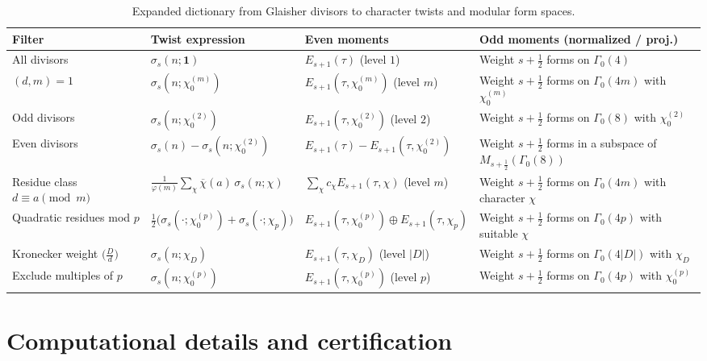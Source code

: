 \documentclass[11pt]{article}
\theoremstyle{definition}
\theoremstyle{remark}
\begin{document}
\begin{table}[h]
\centering
\renewcommand{\arraystretch}{1.2}
\small
\begin{tabularx}{\textwidth}{|l|X|X|X|}
\hline
\textbf{Filter} & \textbf{Twist expression} &
\textbf{Even moments} & \textbf{Odd moments (normalized / proj.)} \\
\hline
All divisors &
$\sigma_s(n;\mathbf 1)$ &
$E_{s+1}(\tau)$ (level $1$) &
Weight $s+\tfrac12$ forms on $\Gamma_0(4)$ \\
\hline
$(d,m)=1$ &
$\sigma_s(n;\chi_0^{(m)})$ &
$E_{s+1}(\tau,\chi_0^{(m)})$ (level $m$) &
Weight $s+\tfrac12$ forms on $\Gamma_0(4m)$ with $\chi_0^{(m)}$ \\
\hline
Odd divisors &
$\sigma_s(n;\chi_0^{(2)})$ &
$E_{s+1}(\tau,\chi_0^{(2)})$ (level $2$) &
Weight $s+\tfrac12$ forms on $\Gamma_0(8)$ with $\chi_0^{(2)}$ \\
\hline
Even divisors &
$\sigma_s(n)-\sigma_s(n;\chi_0^{(2)})$ &
$E_{s+1}(\tau)-E_{s+1}(\tau,\chi_0^{(2)})$ &
Weight $s+\tfrac12$ forms in a subspace of $M_{s+\tfrac12}(\Gamma_0(8))$ \\
\hline
Residue class $d\equiv a\pmod m$ &
$\tfrac1{\varphi(m)}\sum_\chi \overline{\chi}(a)\,\sigma_s(n;\chi)$ &
$\sum_\chi c_\chi E_{s+1}(\tau,\chi)$ (level $m$) &
Weight $s+\tfrac12$ forms on $\Gamma_0(4m)$ with character $\chi$ \\
\hline
Quadratic residues mod $p$ &
$\tfrac12\bigl(\sigma_s(\cdot;\chi_0^{(p)})+\sigma_s(\cdot;\chi_p)\bigr)$ &
$E_{s+1}(\tau,\chi_0^{(p)})\oplus E_{s+1}(\tau,\chi_p)$ &
Weight $s+\tfrac12$ forms on $\Gamma_0(4p)$ with suitable $\chi$ \\
\hline
Kronecker weight $\bigl(\tfrac{D}{d}\bigr)$ &
$\sigma_s(n;\chi_D)$ &
$E_{s+1}(\tau,\chi_D)$ (level $|D|$) &
Weight $s+\tfrac12$ forms on $\Gamma_0(4|D|)$ with $\chi_D$ \\
\hline
Exclude multiples of $p$ &
$\sigma_s(n;\chi_0^{(p)})$ &
$E_{s+1}(\tau,\chi_0^{(p)})$ (level $p$) &
Weight $s+\tfrac12$ forms on $\Gamma_0(4p)$ with $\chi_0^{(p)}$ \\
\hline
\end{tabularx}
\caption{Expanded dictionary from Glaisher divisors to character twists
and modular form spaces.}
\label{tab:glaisher-full}
\end{table}


\section{Computational details and certification}\label{app:comp}
\end{document}
